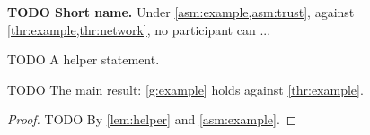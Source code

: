 \begin{guarantees}
  \item\label{g:example} \textbf{TODO Short name.} Under \cref{asm:example,asm:trust}, against \cref{thr:example,thr:network}, no participant can ...
\end{guarantees}


\begin{lemma}[TODO]\label{lem:helper}
TODO A helper statement.
\end{lemma}

\begin{theorem}[TODO]\label{thm:main}
TODO The main result: \cref{g:example} holds against \cref{thr:example}.
\end{theorem}

\begin{proof}
TODO By \cref{lem:helper} and \cref{asm:example}.
\end{proof}

